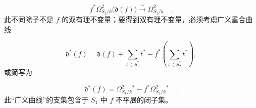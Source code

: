 \begin{equation*}
f^*\Omega^2_{S_2/k}\bigl(\mathfrak d(f)\bigr)
\overset{\sim}{\longrightarrow}\Omega^2_{S_1/k} \quad .
\end{equation*}
此不同除子不是 $f$ 的双有理不变量；要得到双有理不变量，必须考虑广义重合曲线

\begin{equation*}
\mathfrak d^*(f)=\mathfrak d(f)+\sum_{t\in S_1^*}t^*
-f^*\left(\sum_{t\in S_2^*}t^*\right),
\end{equation*}
或简写为

\begin{equation*}
\mathfrak d^*(f)=\Omega^2_{S_1/k}{}^*
-f^*\Omega^2_{S_2/k}{}^* \quad .
\end{equation*}
此“广义曲线”的支集包含于 $S_1$ 中 $f$ 不平展的闭子集。